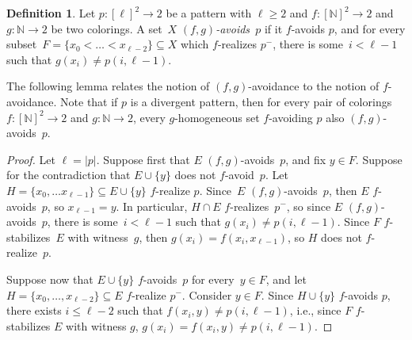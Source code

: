 \documentclass{article}
\newcommand{\NN}[0]{\mathbb{N}}
\def\NN{\mathbb{N}}
\numberwithin{theorem}{section}
\newtheorem{lemma}[theorem]{Lemma}
\theoremstyle{definition}
\newtheorem{definition}[theorem]{Definition}
\begin{document}


\begin{definition}
Let $p : [\ell]^2 \to 2$ be a pattern with $\ell \geq 2$ and $f : [\NN]^2 \to 2$ and $g : \NN \to 2$ be two colorings.
A set~$X$ \emph{$(f,g)$-avoids~$p$} if it $f$-avoids $p$, and for every subset~$F = \{ x_0 < \dots < x_{\ell-2}\} \subseteq X$ 
which $f$-realizes $p^{-}$, there is some~$i < \ell-1$ such that $g(x_i) \neq p(i, \ell-1)$.
\end{definition}

The following lemma relates the notion of $(f, g)$-avoidance to the notion of $f$-avoidance.
Note that if $p$ is a divergent pattern, then for every pair of colorings $f : [\NN]^2 \to 2$ and $g : \NN \to 2$,
every $g$-homogeneous set $f$-avoiding $p$ also $(f, g)$-avoids~$p$.


\begin{proof}
Let $\ell = |p|$.
Suppose first that $E$ $(f, g)$-avoids~$p$, and fix $y \in F$. Suppose for the contradiction that $E \cup \{y\}$ does not $f$-avoid~$p$.
Let $H = \{ x_0, \dots x_{\ell-1} \}\subseteq E \cup \{y\}$ $f$-realize $p$. 
Since~$E$ $(f, g)$-avoids~$p$, then $E$ $f$-avoids~$p$, so $x_{\ell-1} = y$.
In particular, $H \cap E$ $f$-realizes~$p^-$, so since $E$ $(f, g)$-avoids~$p$, there is some~$i < \ell-1$ such that $g(x_i) \neq p(i,\ell-1)$. Since $F$ $f$-stabilizes~$E$ with witness~$g$, then $g(x_i) = f(x_i, x_{\ell-1})$, so $H$ does not $f$-realize~$p$.

Suppose now that $E \cup \{y\}$ $f$-avoids~$p$ for every~$y \in F$, and let $H = \{ x_0, \dots, x_{\ell -2} \} \subseteq E$ $f$-realize $p^-$. Consider $y \in F$. Since $H \cup \{y\}$ $f$-avoids $p$, there exists $i \leq \ell-2$ such that $f(x_i,y) \neq p(i,\ell-1)$, i.e., since $F$ $f$-stabilizes $E$ with witness $g$, $g(x_i)=f(x_i,y) \neq p(i,\ell-1)$. 
\end{proof}
\end{document}
